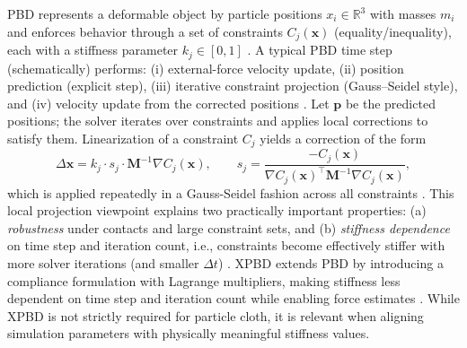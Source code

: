 \ac{PBD} represents a deformable object by particle positions
$x_i \in \mathbb{R}^3$ with masses $m_i$ and enforces behavior through a set of constraints
$C_j(\mathbf{x})$ (equality/inequality), each with a stiffness parameter $k_j \in [0,1]$
\cite{muller2007pbd}. A typical \ac{PBD} time step (schematically) performs:
(i) external-force velocity update, (ii) position prediction (explicit step),
(iii) iterative constraint projection (Gauss--Seidel style), and (iv) velocity update from the
corrected positions \cite{muller2007pbd}. Let $\mathbf{p}$ be the predicted positions; the
solver iterates over constraints and applies local corrections to satisfy them. Linearization of
a constraint $C_j$ yields a correction of the form
\begin{equation}
\Delta \mathbf{x} = k_j \cdot s_j \cdot \mathbf{M}^{-1}\nabla C_j(\mathbf{x}), \qquad
s_j = \frac{-C_j(\mathbf{x})}{\nabla C_j(\mathbf{x})^\top \mathbf{M}^{-1} \nabla C_j(\mathbf{x})},
\label{eq:pbd_delta}
\end{equation}
which is applied repeatedly in a Gauss-Seidel fashion across all constraints
\cite{macklin2016xpbd,muller2007pbd}. This local projection viewpoint explains two
practically important properties: (a) \emph{robustness} under contacts and large constraint
sets, and (b) \emph{stiffness dependence} on time step and iteration count, i.e., constraints
become effectively stiffer with more solver iterations (and smaller $\Delta t$)
\cite{macklin2016xpbd,muller2007pbd}.
\ac{XPBD} extends \ac{PBD} by introducing a compliance formulation with Lagrange multipliers,
making stiffness less dependent on time step and iteration count while enabling force
estimates \cite{macklin2016xpbd}. While \ac{XPBD} is not strictly required for particle cloth, it
is relevant when aligning simulation parameters with physically meaningful stiffness values.


